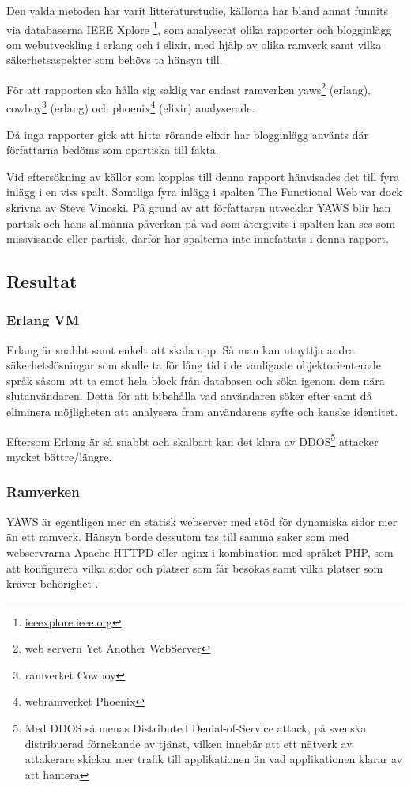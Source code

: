 \documentclass[12pt]{article}
\begin{document}
Den valda metoden har varit litteraturstudie, källorna har bland annat funnits via databaserna IEEE Xplore  \footnote{ \url{ieeexplore.ieee.org}},  som analyserat olika rapporter och blogginlägg om webutveckling i erlang och i elixir, med hjälp av olika ramverk samt vilka säkerhetsaspekter som behövs ta hänsyn till.

För att rapporten ska hålla sig saklig var endast ramverken yaws\footnote{web servern Yet Another WebServer\cite{yawsorg}} (erlang), cowboy\footnote{ramverket Cowboy\cite{cowboyorg}} (erlang) och phoenix\footnote{webramverket Phoenix\cite{phoenixorg}} (elixir) analyserade.

Då inga rapporter gick att hitta rörande elixir har blogginlägg använts där författarna bedöms som opartiska till fakta.

Vid eftersökning av källor som kopplas till denna rapport hänvisades det till fyra inlägg i en viss spalt.
Samtliga fyra inlägg i spalten The Functional Web var dock skrivna av Steve Vinoski. På grund av att författaren utvecklar YAWS blir han partisk och hans allmänna påverkan på vad som återgivits i spalten kan ses som missvisande eller partisk, därför har spalterna inte innefattats i denna rapport.

\subsection{ Resultat}

\subsubsection*{Erlang VM}
	Erlang är snabbt samt enkelt att skala upp. Så man kan utnyttja andra säkerhetslösningar som skulle ta för lång tid i de vanligaste objektorienterade språk såsom att ta emot hela block från databasen och söka igenom dem nära slutanvändaren. Detta för att bibehålla vad användaren söker efter samt då eliminera möjligheten att analysera fram användarens syfte och kanske identitet\cite{database}.

Eftersom Erlang är så snabbt och skalbart kan det klara av DDOS\footnote{Med DDOS så menas Distributed Denial-of-Service attack, på svenska distribuerad förnekande av tjänst, vilken innebär att ett nätverk av attakerare skickar mer trafik till applikationen än vad applikationen klarar av att hantera} attacker mycket bättre/längre.\cite{resource-safe}

\subsubsection*{Ramverken}
YAWS är egentligen mer en statisk webserver med stöd för dynamiska sidor mer än ett ramverk. Hänsyn borde dessutom tas till samma saker som med webservrarna Apache HTTPD eller nginx i kombination med språket PHP, som att konfigurera vilka sidor och platser som får besökas samt vilka platser som kräver behörighet \cite{yaws}.
\end{document}
